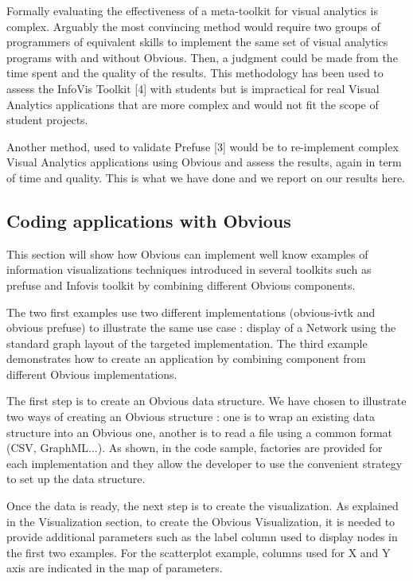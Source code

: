 Formally evaluating the effectiveness of a meta-toolkit for visual analytics is complex. Arguably the most convincing method would require two groups of programmers of equivalent skills to implement the same set of visual analytics programs with and without Obvious. Then, a judgment could be made from the time spent and the quality of the results. This methodology has been used to assess the InfoVis Toolkit [4] with students but is impractical for real Visual Analytics applications that are more complex and would not fit the scope of student projects.

Another method, used to validate Prefuse [3] would be to re-implement complex Visual Analytics applications using Obvious and assess the results, again in term of time and quality. This is what we have done and we report on our results here.

\subsection{Coding applications with Obvious}

This section will show how Obvious can implement well know examples of information visualizations techniques introduced in several toolkits such as prefuse and Infovis toolkit by combining different Obvious components.

The two first examples use two different implementations (obvious-ivtk and obvious prefuse) to illustrate the same use case : display of a Network using the standard graph layout of the targeted implementation. The third example demonstrates how to create an application by combining component from different Obvious implementations.

The first step is to create an Obvious data structure. We have chosen to illustrate two ways of creating an Obvious structure : one is to wrap an existing data structure into an Obvious one, another is to read a file using a common format (CSV, GraphML...). As shown, in the code sample, factories are provided for each implementation and they allow the developer to use the convenient strategy to set up the data structure. 

Once the data is ready, the next step is to create the visualization. As explained in the Visualization section,  to create the Obvious Visualization, it is needed to provide additional parameters such as the label column used to display nodes in the first two examples. For the scatterplot example, columns used for X and Y axis are indicated in the map of parameters.

